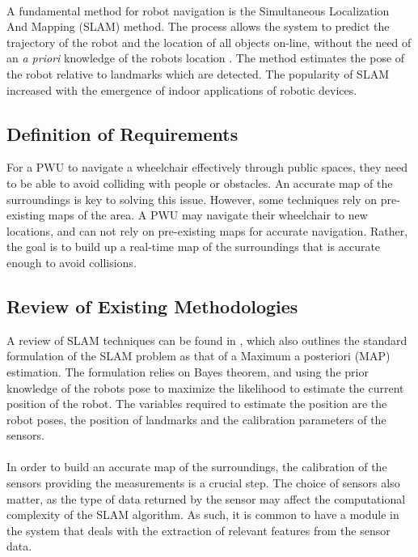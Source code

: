 \paragraph{}A fundamental method for robot navigation is the Simultaneous Localization And Mapping (SLAM) method. The process allows the system to predict the trajectory of the robot and the location of all objects on-line, without the need of an \textit{a priori} knowledge of the robots location \citep{Bailey2006a}. The method estimates the pose of the robot relative to landmarks which are detected. The popularity of SLAM increased with the emergence of indoor applications of robotic devices.

\subsection{Definition of Requirements}
For a PWU to navigate a wheelchair effectively through public spaces, they need to be able to avoid colliding with people or obstacles. An accurate map of the surroundings is key to solving this issue. However, some techniques rely on pre-existing maps of the area. A PWU may navigate their wheelchair to new locations, and can not rely on pre-existing maps for accurate navigation. Rather, the goal is to build up a real-time map of the surroundings that is accurate enough to avoid collisions.

\subsection{Review of Existing Methodologies}
A review of SLAM techniques can be found in \cite{Cadena2016}, which also outlines the standard formulation of the SLAM problem as that of a Maximum a posteriori (MAP) estimation. The formulation relies on Bayes theorem, and using the prior knowledge of the robots pose to maximize the likelihood to estimate the current position of the robot. The variables required to estimate the position are the robot poses, the position of landmarks and the calibration parameters of the sensors.

\paragraph{}In order to build an accurate map of the surroundings, the calibration of the sensors providing the measurements is a crucial step. The choice of sensors also matter, as the type of data returned by the sensor may affect the computational complexity of the SLAM algorithm. As such, it is common to have a module in the system that deals with the extraction of relevant features from the sensor data.

